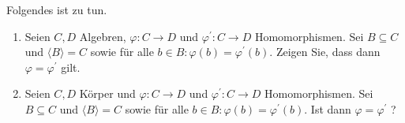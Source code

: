 \begin{exercise}
    Folgendes ist zu tun.
    \begin{enumerate}[label = (\roman*)]
        \item Seien $C,D$ Algebren, $\varphi:C \to D$ und $\varphi^\prime:C \to D$ Homomorphismen. Sei $B \subseteq C$ und $\langle B \rangle = C$ sowie für alle $b \in B: \varphi(b) = \varphi^\prime(b)$. Zeigen Sie, dass dann $\varphi = \varphi^\prime$ gilt.
        
        \item Seien $C,D$ Körper und  $\varphi:C \to D$ und $\varphi^\prime:C \to D$ Homomorphismen. Sei $B \subseteq C$ und $\langle B \rangle = C$ sowie für alle $b \in B: \varphi(b) = \varphi^\prime(b)$. Ist dann $\varphi = \varphi^\prime$ ?
    \end{enumerate}
\end{exercise}

